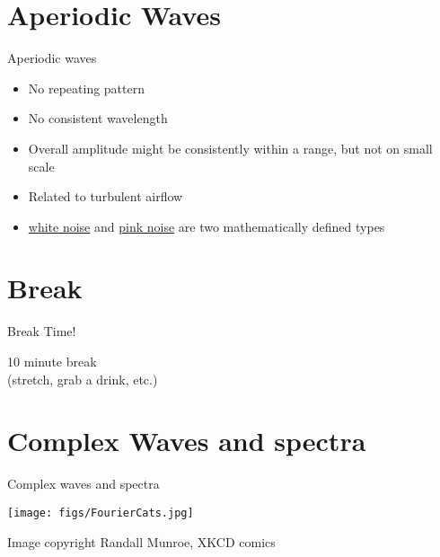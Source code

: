 \documentclass[professionalfonts]{beamer}
\begin{document}
\section*{Aperiodic Waves}

\begin{frame}{Aperiodic waves}
    \begin{itemize}
        \item No repeating pattern
        \item No consistent wavelength
        \item Overall amplitude might be consistently within a range, but not on small scale
        \item Related to turbulent airflow
        \item \href{https://en.wikipedia.org/wiki/White_noise}{white noise} and \href{https://en.wikipedia.org/wiki/Pink_noise}{pink noise} are two mathematically defined types
    \end{itemize}
\end{frame}

\section*{Break}

\begin{frame}{Break Time!}
    \begin{center}
        \Huge 10 minute break \\ (stretch, grab a drink, etc.)
    \end{center}
\end{frame}

\section*{Complex Waves and spectra}

\begin{frame}{Complex waves and spectra}
    \begin{center}
        \texttt{[image: figs/FourierCats.jpg]}    
    \end{center}
    
    {\footnotesize Image copyright Randall Munroe, XKCD comics}
\end{frame}
\end{document}
